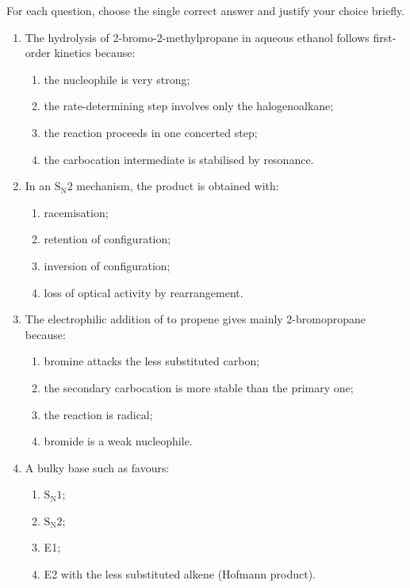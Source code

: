 \documentclass[11pt]{article}
\begin{document}
\begin{exercice}
For each question, choose the single correct answer and justify your choice briefly.
\begin{enumerate}
\item The hydrolysis of 2-bromo-2-methylpropane in aqueous ethanol follows first-order kinetics because:
\begin{enumerate}
\item the nucleophile is very strong;
\item the rate-determining step involves only the halogenoalkane;
\item the reaction proceeds in one concerted step;
\item the carbocation intermediate is stabilised by resonance.
\end{enumerate}
\item In an $\mathrm{S_N2}$ mechanism, the product is obtained with:
\begin{enumerate}
\item racemisation;
\item retention of configuration;
\item inversion of configuration;
\item loss of optical activity by rearrangement.
\end{enumerate}
\item The electrophilic addition of  to propene gives mainly 2-bromopropane because:
\begin{enumerate}
\item bromine attacks the less substituted carbon;
\item the secondary carbocation is more stable than the primary one;
\item the reaction is radical;
\item bromide is a weak nucleophile.
\end{enumerate}
\item A bulky base such as  favours:
\begin{enumerate}
\item $\mathrm{S_N1}$;
\item $\mathrm{S_N2}$;
\item E1;
\item E2 with the less substituted alkene (Hofmann product).
\end{enumerate}
\end{enumerate}
\end{exercice}
\end{document}
